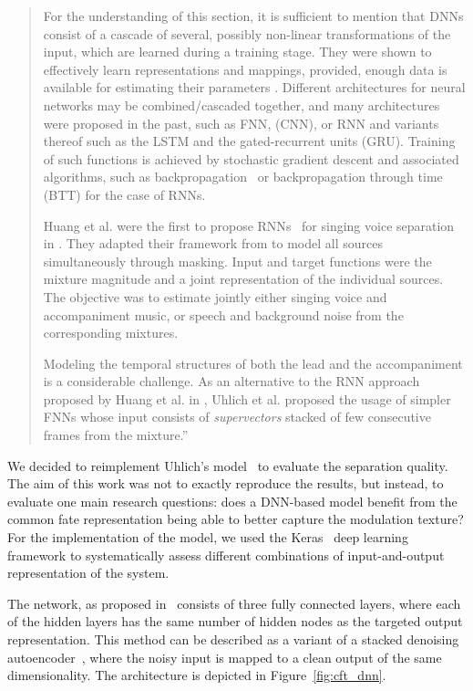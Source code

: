 \begin{quote}
  For the understanding of this section, it is sufficient to mention that DNNs consist of a cascade of several, possibly non-linear transformations of the input, which are learned during a training stage.
  They were shown to effectively learn representations and mappings, provided, enough data is available for estimating their parameters \cite{deng14, lecun15, goodfellow16}.
  Different architectures for neural networks may be combined/cascaded together, and many architectures were proposed in the past, such as \ac{FNN}, (\ac{CNN}), or \ac{RNN} and variants thereof such as the \ac{LSTM} and the gated-recurrent units (GRU).
  Training of such functions is achieved by stochastic gradient descent \cite{robbins51} and associated algorithms, such as backpropagation~\cite{rumelhart862} or backpropagation through time~\cite{rumelhart86} (BTT) for the case of \acs{RNN}s.
  \par
  Huang et al. were the first to propose \acs{RNN}s~\cite{hermans13,pascanu14} for singing voice separation in \cite{huang14,huang15}. They adapted their framework from \cite{huang142} to model all sources simultaneously through masking. Input and target functions were the mixture magnitude and a joint representation of the individual sources. The objective was to estimate jointly either singing voice and accompaniment music, or speech and background noise from the corresponding mixtures.
  \par
  Modeling the temporal structures of both the lead and the accompaniment is a considerable challenge. As an alternative to the \acs{RNN} approach proposed by Huang et al. in \cite{huang14}, Uhlich et al. proposed the usage of simpler \acs{FNN}s \cite{uhlich15} whose input consists of \textit{supervectors} stacked of few consecutive frames from the mixture.''
\end{quote}

We decided to reimplement Uhlich's model~\cite{uhlich15} to evaluate the separation quality.
The aim of this work was not to exactly reproduce the results, but instead, to evaluate one main research questions: does a DNN-based model benefit from the common fate representation being able to better capture the modulation texture?
For the implementation of the model, we used the Keras~\cite{chollet15} deep learning framework to systematically assess different combinations of input-and-output representation of the system.
\par
The network, as proposed in~\cite{uhlich15} consists of three fully connected layers, where each of the hidden layers has the same number of hidden nodes as the targeted output representation.
This method can be described as a variant of a stacked denoising autoencoder~\cite{pvincent08}, where the noisy input is mapped to a clean output of the same dimensionality.
The architecture is depicted in Figure~\ref{fig:cft_dnn}. 

